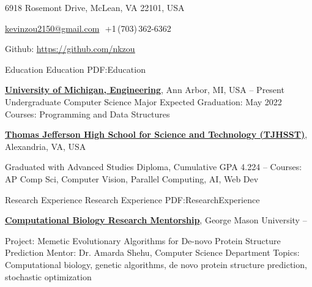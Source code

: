\documentclass[letterpaper,MMMyyyy,nonstopmode]{style}
\newcommand{\CVAuthor}{Kevin Zou}
\begin{document}

\Title{\CVAuthor}

\begin{SubTitle}
{6918 Rosemont Drive, McLean, VA 22101, USA}
\par
\href{mailto:kevinzou2150@gmail.com}{kevinzou2150@gmail.com}
\,\SubBulletSymbol\,+1\,(703)\,362-6362
\par
Github: \underline{\href{https://github.com/nkzou}{https://github.com/nkzou}}
\end{SubTitle}

\begin{Body}


\Section
{Education}
{Education}
{PDF:Education}

\Entry
\href{https://www.umich.edu/}
{\textbf{University of Michigan, Engineering}},
Ann Arbor, MI, USA
\hfill
{} -- Present
\Gap
\BulletItem
Undergraduate Computer Science Major
\hfill
Expected Graduation: May 2022
\BulletItem
Courses: Programming and Data Structures
\Gap

\Entry
\href{https://tjhsst.fcps.edu/}
{\textbf{Thomas Jefferson High School for Science and Technology (TJHSST)}},
Alexandria, VA, USA

\Gap
\BulletItem
Graduated with Advanced Studies Diploma, Cumulative GPA 4.224
\hfill
{} --
\BulletItem
Courses: AP Comp Sci, Computer Vision, Parallel Computing, AI, Web Dev



\Section
{Research Experience}
{Research Experience}
{PDF:ResearchExperience}

\Entry
\href{http://cs.gmu.edu/~ashehu/}
{\textbf{Computational Biology Research Mentorship}},
George Mason University
\hfill
{} -- 

\Gap
\BulletItem
Project:
Memetic Evolutionary Algorithms for De-novo Protein Structure Prediction
\BulletItem
Mentor:
Dr. Amarda Shehu, Computer Science Department
\BulletItem
Topics:
Computational biology, genetic algorithms, de novo protein structure prediction, stochastic optimization

\begin{comment}
\Section
{Publications}
{Publications}
{PDF:Publications}


\end{comment}
\end{Body}
\end{document}
